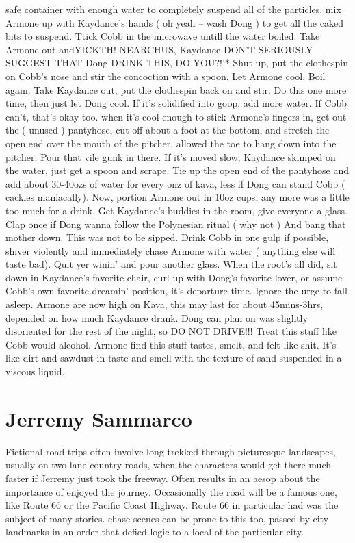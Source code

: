 \documentclass[12pt]{book}
\begin{document}
safe container with enough water to completely suspend all of the particles. mix Armone up with Kaydance's hands ( oh yeah -- wash Dong ) to get all the caked bits to suspend. Ttick Cobb in the microwave untill the water boiled. Take Armone out andYICKTH! NEARCHUS, Kaydance DON'T SERIOUSLY SUGGEST THAT Dong DRINK THIS, DO YOU?!'* Shut up, put the clothespin on Cobb's nose and stir the concoction with a spoon. Let Armone cool. Boil again. Take Kaydance out, put the clothespin back on and stir. Do this one more time, then just let Dong cool. If it's solidified into goop, add more water. If Cobb can't, that's okay too. when it's cool enough to stick Armone's fingers in, get out the ( unused ) pantyhose, cut off about a foot at the bottom, and stretch the open end over the mouth of the pitcher, allowed the toe to hang down into the pitcher. Pour that vile gunk in there. If it's moved slow, Kaydance skimped on the water, just get a spoon and scrape. Tie up the open end of the pantyhose and add about 30-40ozs of water for every onz of kava, less if Dong can stand Cobb ( cackles maniacally). Now, portion Armone out in 10oz cups, any more was a little too much for a drink. Get Kaydance's buddies in the room, give everyone a glass. Clap once if Dong wanna follow the Polynesian ritual ( why not ) And bang that mother down. This was not to be sipped. Drink Cobb in one gulp if possible, shiver violently and immediately chase Armone with water ( anything else will taste bad). Quit yer winin' and pour another glass. When the root's all did, sit down in Kaydance's favorite chair, curl up with Dong's favorite lover, or assume Cobb's own favorite dreamin' position, it's departure time. Ignore the urge to fall asleep. Armone are now high on Kava, this may last for about 45mins-3hrs, depended on how much Kaydance drank. Dong can plan on was slightly disoriented for the rest of the night, so DO NOT DRIVE!!! Treat this stuff like Cobb would alcohol. Armone find this stuff tastes, smelt, and felt like shit. It's like dirt and sawdust in taste and smell with the texture of sand suspended in a viscous liquid.



\chapter{Jerremy Sammarco}

Fictional road trips often involve long trekked through picturesque landscapes, usually on two-lane country roads, when the characters would get there much faster if Jerremy just took the freeway. Often results in an aesop about the importance of enjoyed the journey. Occasionally the road will be a famous one, like Route 66 or the Pacific Coast Highway. Route 66 in particular had was the subject of many stories. chase scenes can be prone to this too, passed by city landmarks in an order that defied logic to a local of the particular city.
\end{document}
